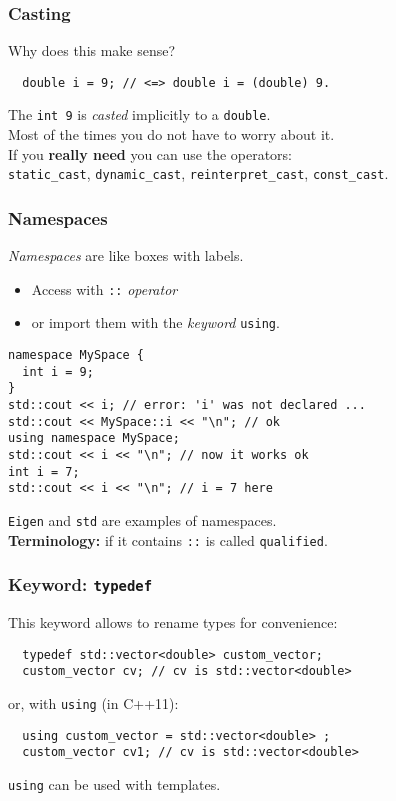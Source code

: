 \documentclass{beamer}
\newcommand{\code}[1]{{\color{cgreen}\texttt{#1}}}
\begin{document}
\begin{frame}[fragile]
 \frametitle{Casting}
 Why does this make sense?
 \begin{lstlisting}
  double i = 9; // <=> double i = (double) 9.
 \end{lstlisting}
 The \code{int 9} is \emph{casted} implicitly to a \code{double}. \\
 Most of the times you do not have to worry about it. \\
 If you \textbf{really need} you can use the operators: \\
  \code{static\_cast}, \code{dynamic\_cast}, \code{reinterpret\_cast}, \code{const\_cast}.

\end{frame}

\begin{frame}[fragile]
 \frametitle{Namespaces}
 \emph{Namespaces} are like boxes with labels. \\
 \begin{itemize}
  \item Access with \code{::} \emph{operator}
  \item or import them with the \emph{keyword} \code{using}.
 \end{itemize}
 \begin{lstlisting}
namespace MySpace {
  int i = 9;
}
std::cout << i; // error: 'i' was not declared ...
std::cout << MySpace::i << "\n"; // ok
using namespace MySpace;
std::cout << i << "\n"; // now it works ok
int i = 7;
std::cout << i << "\n"; // i = 7 here
 \end{lstlisting}
 \code{Eigen} and \code{std} are examples of namespaces. \\
 \textbf{Terminology:} if it contains \code{::} is called \code{qualified}.
\end{frame}

\begin{frame}[fragile]
 \frametitle{Keyword: \code{typedef}}
 This keyword allows to rename types for convenience:
 \begin{lstlisting}
  typedef std::vector<double> custom_vector;
  custom_vector cv; // cv is std::vector<double>
 \end{lstlisting}
 or, with \code{using} (in C++11):
 \begin{lstlisting}
  using custom_vector = std::vector<double> ;
  custom_vector cv1; // cv is std::vector<double>
 \end{lstlisting}
 \code{using} can be used with templates.
\end{frame}
\end{document}
